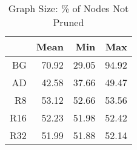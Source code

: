 \begin{table}[ht]
\caption{Graph Size: \% of Nodes Not Pruned}
  \label{table-graphsize}
\begin{center}
\begin{tabular}{rrrr}
  \hline
 & Mean  & Min  & Max  \\ 
  \hline
BG & 70.92 & 29.05 & 94.92 \\ 
  AD & 42.58 & 37.66 & 49.47 \\ 
  R8 & 53.12 & 52.66 & 53.56 \\ 
  R16 & 52.23 & 51.98 & 52.42 \\ 
  R32 & 51.99 & 51.88 & 52.14 \\ 
   \hline
\end{tabular}
\end{center}
\end{table}

